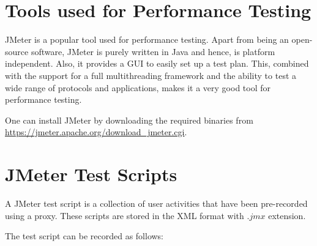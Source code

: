 \documentclass[12pt]{article}
\begin{document}
\section*{Tools used for Performance Testing}
JMeter is a popular tool used for performance testing. Apart from being an open-source software, JMeter is purely written in Java and hence, is platform independent. Also, it provides a GUI to easily set up a test plan. This, combined with the support for a full multithreading framework and the ability to test a wide range of protocols and applications, makes it a very good tool for performance testing.
\par
One can install JMeter by downloading the required binaries from
\\
\url{https://jmeter.apache.org/download_jmeter.cgi}.
\par
\section*{JMeter Test Scripts}
A JMeter test script is a collection of user activities that have been pre-recorded using a proxy. These scripts are stored in the XML format with $.jmx$ extension.
\par
The test script can be recorded as follows:
\end{document}
